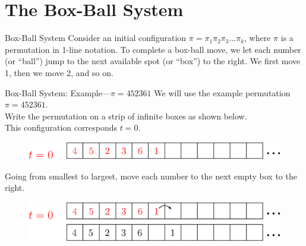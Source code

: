 \documentclass[aspectratio=169, serif]{beamer}
\begin{document}
\section{The Box-Ball System}
\begin{frame}{Box-Ball System}
        Consider an initial configuration $\pi=\pi_1\pi_2\pi_3...\pi_k$, where $\pi$ is a permutation in 1-line notation.
        \vspace{5mm}
        \newline To complete a box-ball move, we let each number (or ``ball'') jump to the next available spot (or ``box'') to the right. We first move 1, then we move 2, and so on.
        
    \end{frame}

    \begin{frame}{Box-Ball System: Example---$\pi=452361$}
    \centering
        We will use the example permutation $\pi=452361$.\\
        \pause
        \RaggedRight
        \vspace{2mm}
        \phantom{---}Write the permutation on a strip of infinite boxes as shown below.\\\centering This configuration corresponds $t=0$.\\
        \RaggedRight
        \begin{figure}[H]
            \centering
            \includegraphics[width = 5in]{Step_1.eps}
        \end{figure}
        \pause
        \phantom{---}Going from smallest to largest, move each number to the next empty box to the right.\\
        \begin{figure}[H]
            \centering
            \includegraphics[width = 5in]{Step2V2.eps}
        \end{figure}    
    \end{frame}
\end{document}
